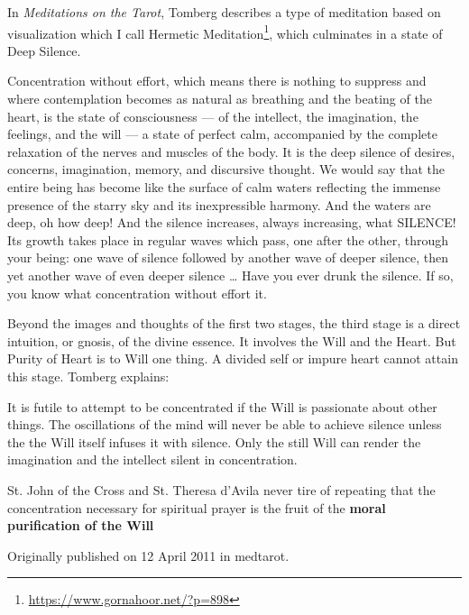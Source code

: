 In \emph{Meditations on the Tarot}, Tomberg describes a type of meditation based on visualization which I call Hermetic Meditation\footnote{\url{https://www.gornahoor.net/?p=898}}, which culminates in a state of Deep Silence.

\begin{quotex}
Concentration without effort, which means there is nothing to suppress and where contemplation becomes as natural as breathing and the beating of the heart, is the state of consciousness — of the intellect, the imagination, the feelings, and the will — a state of perfect calm, accompanied by the complete relaxation of the nerves and muscles of the body. It is the deep silence of desires, concerns, imagination, memory, and discursive thought. We would say that the entire being has become like the surface of calm waters reflecting the immense presence of the starry sky and its inexpressible harmony. And the waters are deep, oh how deep! And the silence increases, always increasing, what SILENCE! Its growth takes place in regular waves which pass, one after the other, through your being: one wave of silence followed by another wave of deeper silence, then yet another wave of even deeper silence … Have you ever drunk the silence. If so, you know what concentration without effort it. 

\end{quotex}
Beyond the images and thoughts of the first two stages, the third stage is a direct intuition, or gnosis, of the divine essence. It involves the Will and the Heart. But Purity of Heart is to Will one thing. A divided self or impure heart cannot attain this stage. Tomberg explains:

\begin{quotex}
It is futile to attempt to be concentrated if the Will is passionate about other things. The oscillations of the mind will never be able to achieve silence unless the the Will itself infuses it with silence. Only the still Will can render the imagination and the intellect silent in concentration.

St. John of the Cross and St. Theresa d'Avila never tire of repeating that the concentration necessary for spiritual prayer is the fruit of the \textbf{moral purification of the Will}

\end{quotex}

\hfill

Originally published on 12 April 2011 in medtarot.



